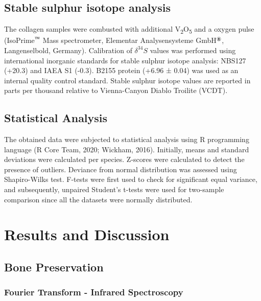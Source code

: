 \documentclass[5p]{elsarticle} %
\begin{document}
\hypertarget{stable-sulphur-isotope-analysis}{%
\subsection{Stable sulphur isotope analysis}\label{stable-sulphur-isotope-analysis}}

The collagen samples were combusted with additional V\textsubscript{2}O\textsubscript{5} and a oxygen pulse (IsoPrime\(^\text{\texttrademark}\) Mass spectrometer, Elementar Analysensysteme GmbH\(^\text{\textregistered}\), Langenselbold, Germany). Calibration of \(\delta ^{34}S\) values was performed using international inorganic standards for stable sulphur isotope analysis: NBS127 (+20.3\permil) and IAEA S1 (-0.3\permil). B2155 protein (+6.96 ± 0.04\permil) was used as an internal quality control standard. Stable sulphur isotope values are reported in parts per thousand relative to Vienna-Canyon Diablo Troilite (VCDT).

\hypertarget{statistical-analysis}{%
\subsection{Statistical Analysis}\label{statistical-analysis}}

The obtained data were subjected to statistical analysis using R programming language (R Core Team, 2020; Wickham, 2016). Initially, means and standard deviations were calculated per species. Z-scores were calculated to detect the presence of outliers. Deviance from normal distribution was assessed using Shapiro-Wilks test. F-tests were first used to check for significant equal variance, and subsequently, unpaired Student's t-tests were used for two-sample comparison since all the datasets were normally distributed.

\hypertarget{results-and-discussion}{%
\section{Results and Discussion}\label{results-and-discussion}}

\hypertarget{bone-preservation}{%
\subsection{Bone Preservation}\label{bone-preservation}}

\hypertarget{fourier-transform---infrared-spectroscopy}{%
\subsubsection{Fourier Transform - Infrared Spectroscopy}\label{fourier-transform---infrared-spectroscopy}}
\end{document}

